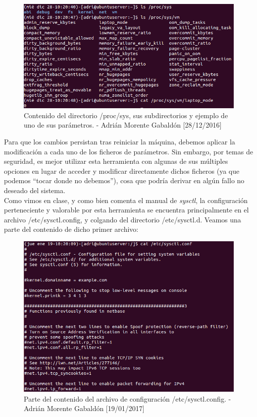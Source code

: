 \begin{figure}[H]
	\centering
	\includegraphics[scale=0.7]{proc-sys}
	\caption{Contenido del directorio /proc/sys, sus subdirectorios y ejemplo de uno de sus parámetros. - Adrián Morente Gabaldón [28/12/2016]}
	\label{figura3}
\end{figure}
Para que los cambios persistan tras reiniciar la máquina, debemos aplicar la modificación a cada uno de los ficheros de parámetros. Sin embargo, por temas de seguridad, es mejor utilizar esta herramienta con algunas de sus múltiples opciones en lugar de acceder y modificar directamente dichos ficheros (ya que podemos ``tocar donde no debemos''), cosa que podría derivar en algún fallo no deseado del sistema.\\
Como vimos en clase, y como bien comenta el manual de \emph{sysctl}, la configuración perteneciente y valorable por esta herramienta se encuentra principalmente en el archivo /etc/sysctl.config, y colgando del directorio /etc/sysctl.d. Veamos una parte del contenido de dicho primer archivo:
\begin{figure}[H]
	\centering
	\includegraphics[scale=0.36]{sysctl-conf}
	\caption{Parte del contenido del archivo de configuración /etc/sysctl.config. - Adrián Morente Gabaldón [19/01/2017]}
	\label{figura5}
\end{figure}
